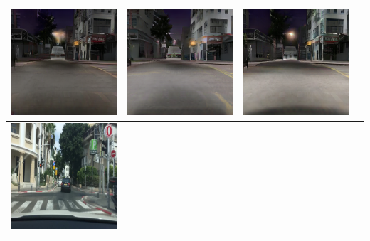 \documentclass{VUMIFPSkursinis}
\begin{document}
\begin{table}[H]
{\begin{tabular}{|c|c|c|c|}
                \includegraphics[scale=0.35]{img/pvz/4_cycle} & \includegraphics[scale=0.35]{img/pvz/4_cut} & \includegraphics[scale=0.35]{img/pvz/4_mspc}
                \\
                \hline
                \includegraphics[scale=0.35]{img/pvz/5_real} & 

\end{tabular}}
\end{table}
\end{document}
